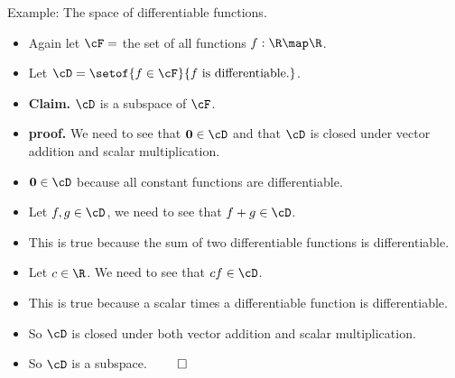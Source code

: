 \documentclass{beamer}
\begin{document}
\begin{frame}{Example: The space of differentiable functions.}

\begin{itemize}
\item Again let $\cF =$ the set of all functions $f:\R\map\R$.
\item Let $\cD = \setof{f\in\cF}{f \text{ is differentiable.}}$.
\item \textbf{Claim.} $\cD$ is a subspace of $\cF$.
\item \textbf{proof.} We need to see that $\textbf{0}\in \cD$ and that
$\cD$ is closed under vector
addition and scalar multiplication.
\item $\textbf{0} \in \cD$ because all constant functions are differentiable.
\item Let $f,g\in \cD$, we need to see that $f+g\in \cD$.
\item This is true because the sum of two differentiable functions is differentiable.
\item Let $c\in \R$. We need to see that $c f \in \cD$.
\item This is true because a scalar times a differentiable function is differentiable.
\item So $\cD$ is closed under both vector addition and scalar multiplication.
\item So $\cD$ is a subspace. $\qed$
\end{itemize}
\end{frame}
\end{document}
